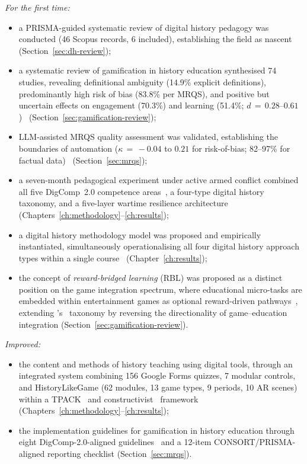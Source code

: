 {\textit{For the first time:}
\begin{itemize}
\item a PRISMA-guided systematic review of digital history pedagogy was conducted (46 Scopus
  records, 6 included), establishing the field as nascent~\citep{Korniienko2025cte}
  (Section~\ref{sec:dh-review});
\item a systematic review of gamification in history education synthesised 74 studies,
  revealing definitional ambiguity (14.9\% explicit definitions), predominantly high risk
  of bias (83.8\% per MRQS), and positive but uncertain effects on engagement (70.3\%)
  and learning (51.4\%; $d\,{=}\,0.28$--$0.61$)~\citep{KorniienkoSemerikov2024}
  (Section~\ref{sec:gamification-review});
\item LLM-assisted MRQS quality assessment was validated, establishing the boundaries of
  automation ($\kappa\,{=}\,-0.04$ to $0.21$ for risk-of-bias; 82--97\% for factual
  data)~\citep{Korniienko2025mrqs} (Section~\ref{sec:mrqs});
\item a seven-month pedagogical experiment under active armed conflict combined all five
  DigComp~2.0 competence areas~\cite{Vuorikari2016}, a four-type digital history taxonomy,
  and a five-layer wartime resilience architecture~\cite{Burde2017, UNESCO2023}
  (Chapters~\ref{ch:methodology}--\ref{ch:results});
\item a digital history methodology model was proposed and empirically instantiated,
  simultaneously operationalising all four digital history approach types within a single
  course~\cite{CohenRosenzweig2006, Siemens2004, Connolly2012} (Chapter~\ref{ch:results});
\item the concept of \textit{reward-bridged learning} (RBL) was proposed as a distinct
  position on the game integration spectrum, where educational micro-tasks are embedded
  within entertainment games as optional reward-driven pathways~\cite{RBL2025},
  extending \citeauthor{Deterding2011}'s~\cite{Deterding2011} taxonomy by reversing
  the directionality of game--education integration (Section~\ref{sec:gamification-review}).
\end{itemize}

\textit{Improved:}
\begin{itemize}
\item the content and methods of history teaching using digital tools, through an integrated
  system combining 156 Google Forms quizzes, 7 modular controls, and HistoryLikeGame
  (62 modules, 13 game types, 9 periods, 10 AR scenes) within a TPACK~\cite{Mishra2006}
  and constructivist~\cite{Vygotsky1978} framework (Chapters~\ref{ch:methodology}--\ref{ch:results});
\item the implementation guidelines for gamification in history education through eight
  DigComp-2.0-aligned guidelines~\citep{Titova2025cte} and a 12-item
  CONSORT/PRISMA-aligned reporting checklist (Section~\ref{sec:mrqs}).
\end{itemize}

}
